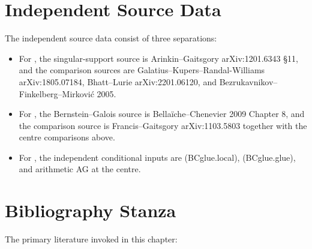 \section{Independent Source Data}
\label{v4-arith:w6-g:data}

\begin{remark}
\label{v4-arith:w6-g:rem:data}
The independent source data consist of three separations:
\begin{itemize}
\item For , the
singular-support source is Arinkin--Gaitsgory arXiv:1201.6343 \S 11,
and the comparison sources are Galatius--Kupers--Randal-Williams
arXiv:1805.07184, Bhatt--Lurie arXiv:2201.06120, and
Bezrukavnikov--Finkelberg--Mirkovi\'c 2005.
\item For , the
Bernstein--Galois source is Bella\"iche--Chenevier 2009 Chapter 8, and
the comparison source is Francis--Gaitsgory arXiv:1103.5803 together
with the centre comparisons above.
\item For , the independent
conditional inputs are (BCglue.local), (BCglue.glue), and arithmetic AG
at the centre.
\end{itemize}
\end{remark}

\section{Bibliography Stanza}
\label{v4-arith:w6-g:bibliography}

The primary literature invoked in this chapter:

